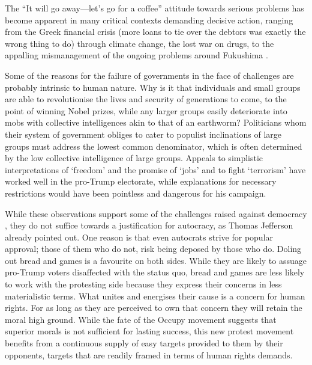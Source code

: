 \documentclass[10pt,a4paper]{article}
\begin{document}
\begin{multicols}{2}

The ``It will go away---let's go for a coffee'' attitude towards serious problems has become apparent in many critical contexts demanding decisive action, ranging from the Greek financial crisis (more loans to tie over the debtors was exactly the wrong thing to do) through climate change, the lost war on drugs, to the appalling mismanagement of the ongoing problems around Fukushima \citep{r08}. 

Some of the reasons for the failure of governments in the face of challenges are probably intrinsic to human nature. Why is it that individuals and small groups are able to revolutionise the lives and security of generations to come, to the point of winning Nobel prizes, while any larger groups easily deteriorate into mobs with collective intelligences akin to that of an earthworm? Politicians whom their system of government obliges to cater to populist inclinations of large groups must address the lowest common denominator, which is often determined by the low collective intelligence of large groups. Appeals to simplistic interpretations of `freedom' and the promise of `jobs' and to fight `terrorism' \citep{r09} have worked well in the pro-Trump electorate, while explanations for necessary restrictions would have been pointless and dangerous for his campaign. 

While these observations support some of the challenges raised against democracy \citep{r05}, they do not suffice towards a justification for autocracy, as Thomas Jefferson already pointed out. One reason is that even autocrats strive for popular approval; those of them who do not, risk being deposed by those who do. Doling out bread and games is a favourite on both sides. While they are likely to assuage pro-Trump voters disaffected with the status quo, bread and games are less likely to work with the protesting side because they express their concerns in less materialistic terms. What unites and energises their cause is a concern for human rights. For as long as they are perceived to own that concern they will retain the moral high ground. While the fate of the Occupy movement suggests that superior morals is not sufficient for lasting success, this new protest movement benefits from a continuous supply of easy targets provided to them by their opponents, targets that are readily framed in terms of human rights demands.


\end{multicols}
\end{document}
